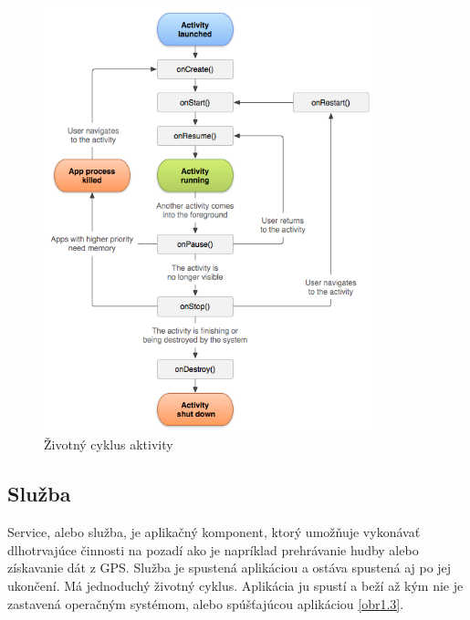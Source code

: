 \begin{figure}[H]
    \begin{center}
        \begin{minipage}{0.80\linewidth}
            \begin{center}
                \includegraphics[width=0.85\textwidth]{images/activity_lifecycle.png}
                \caption{Životný cyklus aktivity}
                \label{obr1.2}
            \end{center}
        \end{minipage}
    \end{center}
\end{figure}

\subsection{Služba}
Service, alebo služba, je aplikačný komponent, ktorý umožňuje vykonávať dlhotrvajúce činnosti na pozadí ako je napríklad prehrávanie hudby alebo získavanie dát z GPS. Služba je spustená aplikáciou a ostáva spustená aj po jej ukončení. Má jednoduchý životný cyklus. Aplikácia ju spustí a beží až kým nie je zastavená operačným systémom, alebo spúšťajúcou aplikáciou \ref{obr1.3}.

